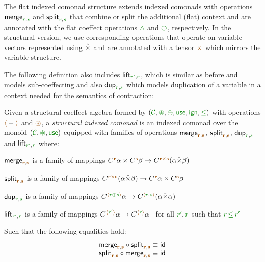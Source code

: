 The flat indexed comonad structure extends indexed comonads with operations 
$\ident{merge}_{\cclrd{r},\cclrd{s}}$ and $\ident{split}_{\cclrd{r},\cclrd{s}}$ 
that combine or split the additional (flat) context and are annotated with the flat 
coeffect operations $\czip$ and $\cpar$, respectively. In the structural version, we use
corresponding operations that operate on variable vectors represented using $\hat{\times}$ and
are annotated with a tensor $\atimes$ which mirrors the variable structure.

The following definition also includes $\ident{lift}_{\cclrd{r'},\cclrd{r}}$, which is similar as
before and models sub-coeffecting and also $\ident{dup}_{\cclrd{r}, \cclrd{s}}$ which models
duplication of a variable in a context needed for the semantics of contraction:

\begin{definition}
Given a structural coeffect algebra formed by $(\C, \cseq, \cpar, \cunit, \czero, \cleq)$
with operations $\alift{-}$ and $\aseq$, a \emph{structural indexed comonad} is an indexed comonad over 
the monoid $(\C, \cseq, \cunit)$ equipped with families of operations $\ident{merge}_{\aclrd{\textbf{r}},\aclrd{\textbf{s}}}$, 
$\ident{split}_{\aclrd{\textbf{r}},\aclrd{\textbf{s}}}$,
$\ident{dup}_{\cclrd{r}, \cclrd{s}}$ and $\ident{lift}_{\cclrd{r'},\cclrd{r}}$ where:
%
\begin{compactitem}
\item $\ident{merge}_{\aclrd{\textbf{r}},\aclrd{\textbf{s}}}$ is a family of mappings
  $\ctyp{\aclrd{\textbf{r}}}{\alpha} \times \ctyp{\aclrd{\textbf{s}}}{\beta} \rightarrow \ctyp{\aclrd{\textbf{r}}\atimes\aclrd{\textbf{s}}}{(\alpha \xtimes \beta)}$
\item $\ident{split}_{\aclrd{\textbf{r}},\aclrd{\textbf{s}}}$ is a family of mappings
  $\ctyp{\aclrd{\textbf{r}}\atimes\aclrd{\textbf{s}}}{(\alpha \xtimes \beta)} \rightarrow \ctyp{\aclrd{\textbf{r}}}{\alpha} \times \ctyp{\aclrd{\textbf{s}}}{\beta}$
\item $\ident{dup}_{\cclrd{r}, \cclrd{s}}$ is a family of mappings
  $\ctyp{\alift{\cclrd{r} \cpar \cclrd{s}}}{\alpha} \rightarrow \ctyp{\alift{\cclrd{r}, \cclrd{s}}}{(\alpha \xtimes \alpha)}$
\item $\ident{lift}_{\cclrd{r'},\cclrd{r}}$ is a family of mappings
  $\ctyp{\alift{\cclrd{r'}}}{\alpha} \rightarrow \ctyp{\alift{\cclrd{r}}}{\alpha}$~ for all $\cclrd{r'}, \cclrd{r}$ such that $\cclrd{r}\,\cleq\,\cclrd{r'}$
\end{compactitem}
%
Such that the following equalities hold:
\begin{equation*}
\begin{array}{l}
  \ident{merge}_{\aclrd{\textbf{r}},\aclrd{\textbf{s}}} \circ \ident{split}_{\aclrd{\textbf{r}},\aclrd{\textbf{s}}} \equiv \ident{id} \\
  \ident{split}_{\aclrd{\textbf{r}},\aclrd{\textbf{s}}} \circ \ident{merge}_{\aclrd{\textbf{r}},\aclrd{\textbf{s}}} \equiv \ident{id} 
\end{array}
\end{equation*}

\end{definition}

